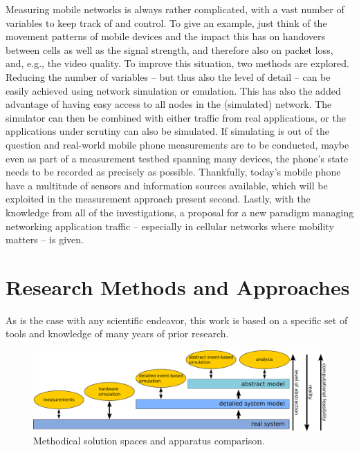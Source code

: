 Measuring mobile networks is always rather complicated, with a vast number of variables to keep track of and control. To give an example, just think of the movement patterns of mobile devices and the impact this has on handovers between cells as well as the signal strength, and therefore also on packet loss, and, e.g., the video quality.
 To improve this situation, two methods are explored. Reducing the number of variables -- but thus also the level of detail -- can be easily achieved using network simulation or emulation. This has also the added advantage of having easy access to all nodes in the (simulated) network. The simulator can then be combined with either traffic from real applications, or the applications under scrutiny can also be simulated.
 If simulating is out of the question and real-world mobile phone measurements are to be conducted, maybe even as part of a measurement testbed spanning many devices, the phone's state needs to be recorded as precisely as possible. Thankfully, today's mobile phone have a multitude of sensors and information sources available, which will be exploited in the measurement approach present second.
 Lastly, with the knowledge from all of the investigations, a proposal for a new paradigm managing networking application traffic -- especially in cellular networks where mobility matters -- is given.



\section{Research Methods and Approaches}

As is the case with any scientific endeavor, this work is based on a specific set of tools and knowledge of many years of prior research.


\begin{figure}[htbp]
    \centering
    \includegraphics[width=1.0\textwidth]{images/apparatus-new.pdf}
    \caption{Methodical solution spaces and apparatus comparison.}
    \label{c1:fig:appcomp}
\end{figure}

